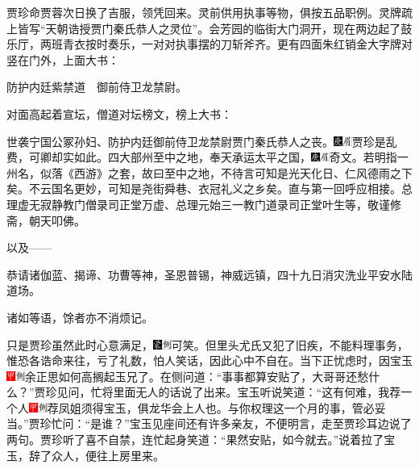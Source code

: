 贾珍命贾蓉次日换了吉服，领凭回来。灵前供用执事等物，俱按五品职例。灵牌疏上皆写``天朝诰授贾门秦氏恭人之灵位''。会芳园的临街大门洞开，现在两边起了鼓乐厅，两班青衣按时奏乐，一对对执事摆的刀斩斧齐。更有四面朱红销金大字牌对竖在门外，上面大书：

防护内廷紫禁道　御前侍卫龙禁尉。

对面高起着宣坛，僧道对坛榜文，榜上大书：

世袭宁国公冢孙妇、防护内廷御前侍卫龙禁尉贾门秦氏恭人之丧。{\includegraphics[width=3mm]{../Images/00004}\includegraphics[width=3mm]{../Images/00010}\footnotesize \kaishu 贾珍是乱费，可卿却实如此。}四大部州至中之地，奉天承运太平之国，{\includegraphics[width=3mm]{../Images/00004}\includegraphics[width=3mm]{../Images/00010}\footnotesize \kaishu 奇文。若明指一州名，似落《西游》之套，故曰至中之地，不待言可知是光天化日、仁风德雨之下矣。不云国名更妙，可知是尧街舜巷、衣冠礼义之乡矣。直与第一回呼应相接。}总理虚无寂静教门僧录司正堂万虚、总理元始三一教门道录司正堂叶生等，敬谨修斋，朝天叩佛。

以及------

恭请诸伽蓝、揭谛、功曹等神，圣恩普锡，神威远镇，四十九日消灾洗业平安水陆道场。

诸如等语，馀者亦不消烦记。

只是贾珍虽然此时心意满足，{\includegraphics[width=3mm]{../Images/00006}\includegraphics[width=3mm]{../Images/00011}\footnotesize \kaishu 可笑。}但里头尤氏又犯了旧疾，不能料理事务，惟恐各诰命来往，亏了礼数，怕人笑话，因此心中不自在。当下正忧虑时，因宝玉{\includegraphics[width=3mm]{../Images/00002}\includegraphics[width=3mm]{../Images/00011}\footnotesize \kaishu 余正思如何高搁起玉兄了。}在侧问道：``事事都算安贴了，大哥哥还愁什么？''贾珍见问，忙将里面无人的话说了出来。宝玉听说笑道：``这有何难，我荐一个人{\includegraphics[width=3mm]{../Images/00002}\includegraphics[width=3mm]{../Images/00011}\footnotesize \kaishu 荐凤姐须得宝玉，俱龙华会上人也。}与你权理这一个月的事，管必妥当。''贾珍忙问：``是谁？''宝玉见座间还有许多亲友，不便明言，走至贾珍耳边说了两句。贾珍听了喜不自禁，连忙起身笑道：``果然安贴，如今就去。''说着拉了宝玉，辞了众人，便往上房里来。

